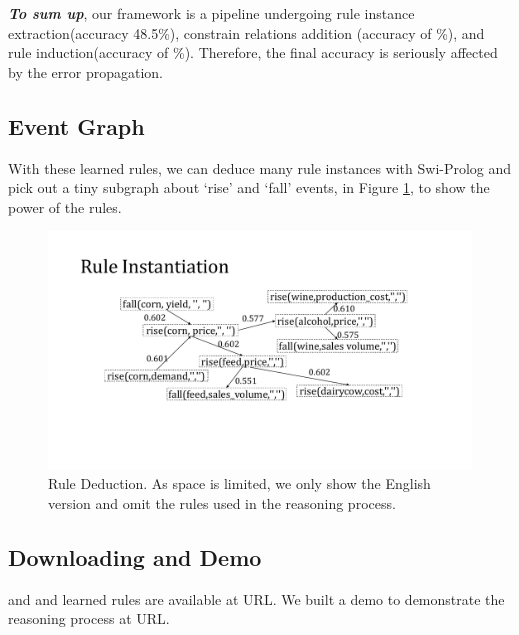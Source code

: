 \textbf{\textit{To sum up}}, our framework is a pipeline undergoing rule instance extraction(accuracy 48.5\%), constrain relations addition (accuracy of \%), and rule induction(accuracy of \%).
Therefore, the final accuracy is seriously affected by the error propagation.

\subsection{Event Graph}
With these learned rules, we can deduce many rule instances with Swi-Prolog and pick out a tiny subgraph about `rise' and `fall' events, in Figure \ref{fig:rule_instantiation_graph}, to show the power of the rules. 

\begin{figure}[htbp]
	\begin{center}
		\includegraphics[width=0.9\columnwidth]{figures/instantiation_graph}
	\end{center}
	\caption{Rule Deduction. As space is limited, we only show the English version and omit the rules used in the reasoning process.}
	\label{fig:rule_instantiation_graph}
\end{figure}

\subsection{Downloading and Demo}
\zhpro and \zhcon and learned rules are available at URL.
We built a demo to demonstrate the reasoning process at URL. 



